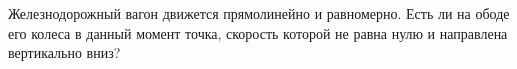 Железнодорожный вагон движется прямолинейно и равномерно. Есть ли
на ободе его колеса в данный момент точка, скорость которой не равна
нулю и направлена вертикально вниз?
